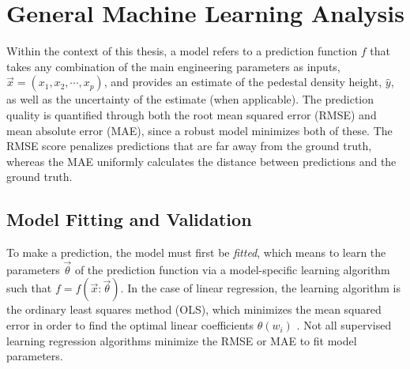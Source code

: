 \documentclass[a4paper, twoside, final, 12pt]{article}
\begin{document}
\section{General Machine Learning Analysis}\label{sec:principle-machine-learning-analysis}
Within the context of this thesis, a model refers to a prediction function $f$ that takes any combination of the main engineering parameters as inputs, $\vec{x} = (x_1, x_2, \cdots, x_p)$,  and provides an estimate of the pedestal density height, $\hat{y}$, as well as the uncertainty of the estimate (when applicable).
The prediction quality is quantified through both the root mean squared error (RMSE) and mean absolute error (MAE), since a robust model minimizes both of these.
The RMSE score penalizes predictions that are far away from the ground truth, whereas the MAE uniformly calculates the distance between predictions and the ground truth.

\subsection{Model Fitting and Validation}
To make a prediction, the model must first be \textit{fitted}, which means to learn the parameters $\vec{\theta}$ of the prediction function via a model-specific learning algorithm such that $f = f(\vec{x}: \vec{\theta})$.
In the case of linear regression, the learning algorithm is the ordinary least squares method (OLS), which minimizes the mean squared error in order to find the optimal linear coefficients $\theta(w_i)$ \cite{OLS}.
Not all supervised learning regression algorithms minimize the RMSE or MAE to fit model parameters. 
\end{document}
